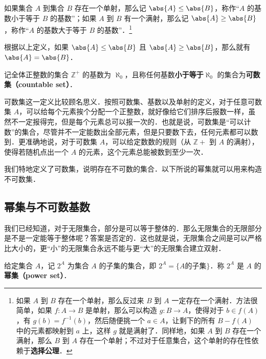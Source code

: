 \begin{definition}{}
如果集合 $A$ 到集合 $B$ 存在一个单射，那么记 $\abs{A}\leq\abs{B}$，称作“$A$ 的基数小于等于 $B$ 的基数”；如果 $A$ 到 $B$ 有一个满射，那么记 $\abs{A}\geq\abs{B}$，称作“$A$ 的基数大于等于 $B$ 的基数”．\footnote{如果 $A$ 到 $B$ 存在一个单射，那么反过来 $B$ 到 $A$ 一定存在一个满射．方法很简单，如果 $f:A\rightarrow B$ 是单射，那么可以构造 $g:B\rightarrow A$，使得对于 $b\in f(A)$，有 $g(b)=f^{-1}(b)$，然后随便挑一个 $a\in A$，让剩下的所有 $B-f(A)$ 中的元素都映射到 $a$ 上，这样 $g$ 就是满射了．同样地，如果 $A$ 到 $B$ 存在一个满射，那么 $B$ 到 $A$ 存在一个单射；不过对于任意集合，这个单射的存在性依赖于\textbf{选择公理}．}
\end{definition}

根据以上定义，如果 $\abs{A}\leq\abs{B}$ 且 $\abs{A}\geq\abs{B}$，那么就有 $\abs{A}=\abs{B}$．

\begin{definition}{}
记全体正整数的集合 $\mathbb{Z}^+$ 的基数为 $\aleph_0$，且称任何基数\textbf{小于等于}$\aleph_0$ 的集合为\textbf{可数集（countable set）}．
\end{definition}

可数集这一定义比较顾名思义．按照可数集、基数以及单射的定义，对于任意可数集 $A$，可以给每个元素挨个分配一个正整数，就好像给它们排序后报数一样，虽然不一定报得完，但是每个元素总可以报一次的．也就是说，可数集是“可以计数”的集合，尽管并不一定能数出全部元素，但是只要数下去，任何元素都可以数到．更准确地说，对于可数集 $A$，可以给定数数的规则（从 $\mathbb{Z}+$ 到 $A$ 的满射），使得若随机点出一个 $A$ 的元素，这个元素总能被数到至少一次．

我们特地定义了可数集，说明存在不可数的集合．以下所说的幂集就可以用来构造不可数集．





\subsection{幂集与不可数基数}

我们已经知道，对于无限集合，部分是可以等于整体的．那么无限集合的无限部分是不是一定能等于整体呢？答案是否定的．这也就是说，无限集合之间是可以严格比大小的，更“小”的无限集合永远不能与更“大”的无限集合建立双射．

\begin{definition}{}
给定集合 $A$，记 $2^A$ 为集合 $A$ 的子集的集合，即 $2^A=\{A\text{的子集}\}$．称 $2^A$ 是 $A$ 的\textbf{幂集（power set）}．
\end{definition}

